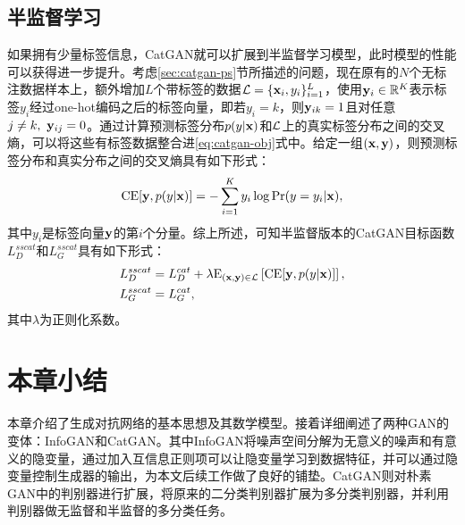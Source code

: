 \subsection{半监督学习}\label{sec:ss-catgan}
如果拥有少量标签信息，CatGAN就可以扩展到半监督学习模型，此时模型的性能可以获得进一步提升。考虑\ref{sec:catgan-ps}节所描述的问题，现在原有的$N$个无标注数据样本上，额外增加$L$个带标签的数据$\mathcal{L} = \{\mathbf{x}_i, y_i\}_{i=1}^L$，使用$\mathbf{y}_i \in \mathbb{R}^K$表示标签$y_i$经过one-hot编码之后的标签向量，即若$y_i = k$，则$\mathbf{y}_{ik} = 1$且对任意$j \neq k,~\mathbf{y}_{ij} = 0$。通过计算预测标签分布$p(y|\mathbf{x})$和$\mathcal{L}$上的真实标签分布之间的交叉熵，可以将这些有标签数据整合进\eqref{eq:catgan-obj}式中。给定一组$(\mathbf{x}, \mathbf{y})$，则预测标签分布和真实分布之间的交叉熵具有如下形式：
\begin{equation}
  \text{CE}[\mathbf{y}, p(y|\mathbf{x})] = -\sum_{i=1}^K y_i \log\Pr(y=y_i|\mathbf{x}),
  \label{eq:cross-ent}
\end{equation}
其中$y_i$是标签向量$\mathbf{y}$的第$i$个分量。综上所述，可知半监督版本的CatGAN目标函数$L_D^{sscat}$和$L_G^{sscat}$具有如下形式：
\begin{equation}
  \begin{split}
    L_D^{sscat} &= L_D^{cat} + \lambda\text{E}_{(\mathbf{x},\mathbf{y}) \in \mathcal{L}}
    \left[ \text{CE}[\mathbf{y}, p(y|\mathbf{x})] \right], \\
    L_G^{sscat} &= L_G^{cat}, 
  \end{split}
  \label{eq:ss-catgan-obj}
\end{equation}
其中$\lambda$为正则化系数。

\section{本章小结}
本章介绍了生成对抗网络的基本思想及其数学模型。接着详细阐述了两种GAN的变体：InfoGAN和CatGAN。其中InfoGAN将噪声空间分解为无意义的噪声和有意义的隐变量，通过加入互信息正则项可以让隐变量学习到数据特征，并可以通过隐变量控制生成器的输出，为本文后续工作做了良好的铺垫。CatGAN则对朴素GAN中的判别器进行扩展，将原来的二分类判别器扩展为多分类判别器，并利用判别器做无监督和半监督的多分类任务。


